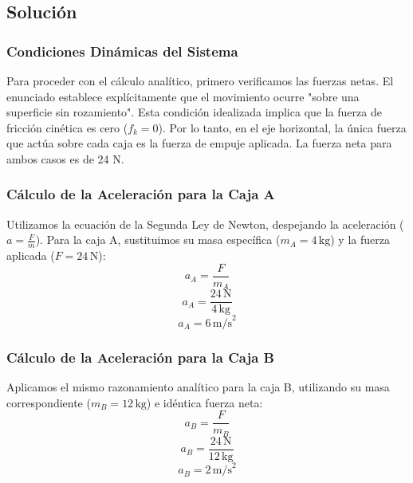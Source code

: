 \documentclass[12pt]{article}
\begin{document}
\subsection*{Solución}

\subsubsection*{Condiciones Dinámicas del Sistema}
Para proceder con el cálculo analítico, primero verificamos las fuerzas netas. El enunciado establece explícitamente que el movimiento ocurre "sobre una superficie sin rozamiento". Esta condición idealizada implica que la fuerza de fricción cinética es cero ($f_k = 0$). Por lo tanto, en el eje horizontal, la única fuerza que actúa sobre cada caja es la fuerza de empuje aplicada. La fuerza neta para ambos casos es de 24 N.

\subsubsection*{Cálculo de la Aceleración para la Caja A}
Utilizamos la ecuación de la Segunda Ley de Newton, despejando la aceleración ($a = \frac{F}{m}$). Para la caja A, sustituimos su masa específica ($m_A = 4 \, \text{kg}$) y la fuerza aplicada ($F = 24 \, \text{N}$):
\begin{equation}
    a_A = \frac{F}{m_A}
\end{equation}
\begin{equation}
    a_A = \frac{24 \, \text{N}}{4 \, \text{kg}}
\end{equation}
\begin{equation}
    a_A = 6 \, \text{m/s}^2
\end{equation}

\subsubsection*{Cálculo de la Aceleración para la Caja B}
Aplicamos el mismo razonamiento analítico para la caja B, utilizando su masa correspondiente ($m_B = 12 \, \text{kg}$) e idéntica fuerza neta:
\begin{equation}
    a_B = \frac{F}{m_B}
\end{equation}
\begin{equation}
    a_B = \frac{24 \, \text{N}}{12 \, \text{kg}}
\end{equation}
\begin{equation}
    a_B = 2 \, \text{m/s}^2
\end{equation}
\end{document}
